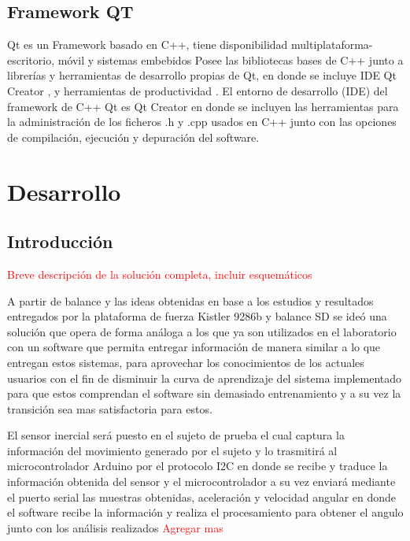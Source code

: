 \documentclass[12pt,a4paper]{article}
\let\stdsection\section
\renewcommand\section{\newpage\stdsection}
\begin{document}
  

\subsection{Framework QT}
Qt es un Framework basado en C++, tiene disponibilidad multiplataforma- escritorio, móvil y sistemas embebidos
Posee las bibliotecas bases de C++  junto a librerías y herramientas de desarrollo propias de Qt, en donde se incluye IDE Qt Creator , y herramientas de productividad .
	El entorno de desarrollo (IDE) del framework de C++ Qt  es Qt Creator en donde se incluyen las herramientas para la administración de los ficheros .h y .cpp usados en C++ junto con las opciones de compilación, ejecución y depuración del software.


\section{Desarrollo}
\subsection{Introducción}
\textcolor{red}{ Breve descripción de la solución completa, incluir esquemáticos}

A partir de balance y las ideas obtenidas en base a los estudios y resultados entregados por la plataforma de fuerza Kistler 9286b y balance SD se ideó una solución que opera de forma análoga a los que ya son utilizados en el laboratorio con un software que permita entregar información de manera similar a lo que entregan estos sistemas, para aprovechar los conocimientos de los actuales usuarios con el fin de disminuir la curva de aprendizaje del sistema implementado para que estos comprendan el software sin demasiado entrenamiento y a su vez la transición sea mas satisfactoria para estos.

El sensor inercial será puesto en el sujeto de prueba el cual captura la información del movimiento generado por el sujeto y lo trasmitirá al microcontrolador Arduino por el protocolo I2C en donde se recibe y traduce la información obtenida del sensor y el microcontrolador a su vez enviará mediante el puerto serial las muestras obtenidas, aceleración y velocidad angular en donde el software recibe la información y realiza el procesamiento para obtener el angulo junto con los análisis realizados \textcolor{red}{Agregar mas }
\end{document}
